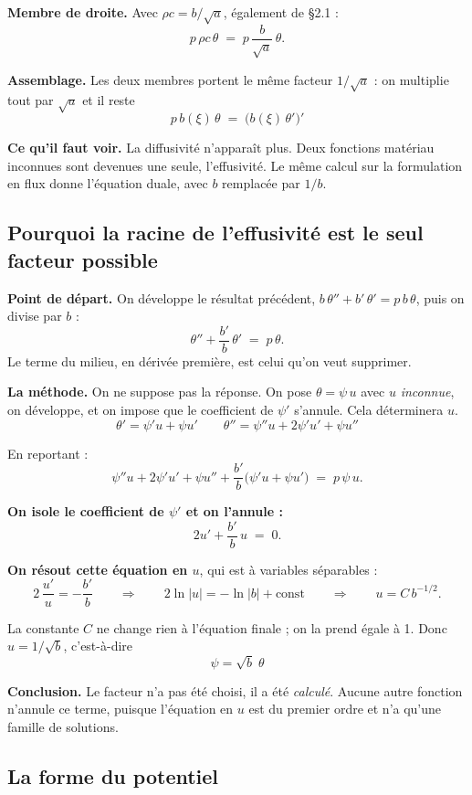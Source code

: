 \documentclass[11pt,a4paper]{article}
\begin{document}
\textbf{Membre de droite.} Avec $\rho c = b/\sqrt{a}$, également de §2.1 :
\[ p\,\rho c\,\theta \;=\; p\,\frac{b}{\sqrt{a}}\,\theta . \]

\textbf{Assemblage.} Les deux membres portent le même facteur $1/\sqrt{a}$ : on multiplie tout par
$\sqrt{a}$ et il reste
\[ \boxed{\; p\,b(\xi)\,\theta \;=\; \bigl(b(\xi)\,\theta'\bigr)' \;} \]

\textbf{Ce qu'il faut voir.} La diffusivité n'apparaît plus. Deux fonctions matériau inconnues sont
devenues une seule, l'effusivité. Le même calcul sur la formulation en flux donne l'équation duale,
avec $b$ remplacée par $1/b$.

\newpage
\subsection{Pourquoi la racine de l'effusivité est le seul facteur possible}

\textbf{Point de départ.} On développe le résultat précédent, $b\,\theta'' + b'\,\theta' = p\,b\,\theta$,
puis on divise par $b$ :
\[ \theta'' + \frac{b'}{b}\,\theta' \;=\; p\,\theta . \]
Le terme du milieu, en dérivée première, est celui qu'on veut supprimer.

\textbf{La méthode.} On ne suppose pas la réponse. On pose $\theta = \psi\,u$ avec $u$ \emph{inconnue},
on développe, et on impose que le coefficient de $\psi'$ s'annule. Cela déterminera $u$.
\[ \theta' = \psi'u + \psi u'
\qquad
\theta'' = \psi''u + 2\psi'u' + \psi u'' \]

En reportant :
\[ \psi''u + 2\psi'u' + \psi u'' + \frac{b'}{b}\bigl(\psi'u + \psi u'\bigr) \;=\; p\,\psi\,u . \]

\textbf{On isole le coefficient de $\psi'$ et on l'annule :}
\[ 2u' + \frac{b'}{b}\,u \;=\; 0 . \]

\textbf{On résout cette équation en $u$}, qui est à variables séparables :
\[ 2\,\frac{u'}{u} = -\frac{b'}{b}
\qquad\Longrightarrow\qquad
2\ln|u| = -\ln|b| + \text{const}
\qquad\Longrightarrow\qquad
u = C\,b^{-1/2} . \]

La constante $C$ ne change rien à l'équation finale ; on la prend égale à 1. Donc $u = 1/\sqrt{b}$,
c'est-à-dire
\[ \boxed{\; \psi = \sqrt{b}\;\theta \;} \]

\textbf{Conclusion.} Le facteur n'a pas été choisi, il a été \emph{calculé}. Aucune autre fonction
n'annule ce terme, puisque l'équation en $u$ est du premier ordre et n'a qu'une famille de solutions.

\subsection{La forme du potentiel}
\end{document}
